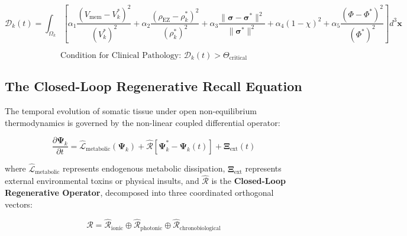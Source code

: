 \documentclass[10pt,twocolumn]{article}
\begin{document}
\begin{equation}
  \mathcal{D}_k(t) = \int_{\Omega_k} \left[ \alpha_1 \frac{(V_{\text{mem}} - V^*_k)^2}{(V^*_k)^2} + \alpha_2 \frac{(\rho_{\text{EZ}} - \rho^*_k)^2}{(\rho^*_k)^2} + \alpha_3 \frac{\|\boldsymbol{\sigma} - \boldsymbol{\sigma}^*\|^2}{\|\boldsymbol{\sigma}^*\|^2} + \alpha_4 (1 - \chi)^2 + \alpha_5 \frac{(\Phi - \Phi^*)^2}{(\Phi^*)^2} \right] d^3\mathbf{x}
\end{equation}

\begin{equation}
  \boxed{\text{Condition for Clinical Pathology: } \mathcal{D}_k(t) > \Theta_{\text{critical}}}
\end{equation}


\subsection{The Closed-Loop Regenerative Recall Equation}

The temporal evolution of somatic tissue under open non-equilibrium thermodynamics is governed by the non-linear coupled differential operator:

\begin{equation}
  \frac{\partial \mathbf{\Psi}_k}{\partial t} = \hat{\mathcal{L}}_{\text{metabolic}}(\mathbf{\Psi}_k) + \hat{\mathcal{R}} \left[ \mathbf{\Psi}^*_k - \mathbf{\Psi}_k(t) \right] + \mathbf{\Xi}_{\text{ext}}(t)
\end{equation}

where $\hat{\mathcal{L}}_{\text{metabolic}}$ represents endogenous metabolic dissipation, $\mathbf{\Xi}_{\text{ext}}$ represents external environmental toxins or physical insults, and $\hat{\mathcal{R}}$ is the \textbf{Closed-Loop Regenerative Operator}, decomposed into three coordinated orthogonal vectors:

\begin{equation}
  \hat{\mathcal{R}} = \hat{\mathcal{R}}_{\text{ionic}} \oplus \hat{\mathcal{R}}_{\text{photonic}} \oplus \hat{\mathcal{R}}_{\text{chronobiological}}
\end{equation}
\end{document}
